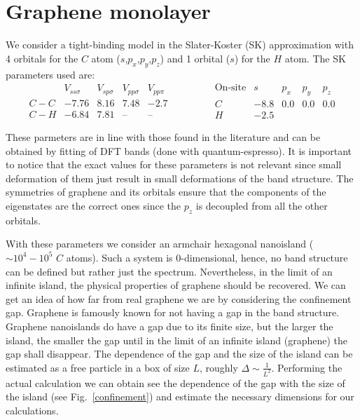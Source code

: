 \chapter{Graphene monolayer}
We consider a tight-binding model in the Slater-Koster (SK) approximation with 4 orbitals for the $C$ atom ($s$,$p_x$,$p_y$,$p_z$) and 1 orbital ($s$) for the $H$ atom. The SK parameters used are:
\begin{equation}
  \begin{array}{l|cccc}
        & V_{ss\sigma} & V_{sp\sigma} & V_{pp\sigma} & V_{pp\pi} \\ \hline
    C-C & -7.76 & 8.16 & 7.48 & -2.7 \\
    C-H & -6.84 & 7.81 & \text{--} & \text{--}
  \end{array}\qquad\qquad
  \begin{array}{c|cccc}
    \text{On-site} & s & p_x & p_y & p_z \\ \hline
    C & -8.8 & 0.0 & 0.0 & 0.0 \\
    H & -2.5 &     &     &
  \end{array}
\label{SK_params}
\end{equation}

These parmeters are in line with those found in the literature\cite{Gosalbez-Martinez2011,Konschuh2010} and can be obtained by fitting of DFT bands (done with quantum-espresso). It is important to notice that the exact values for these parameters is not relevant since small deformation of them just result in small deformations of the band structure. The symmetries of graphene and its orbitals ensure that the components of the eigenstates are the correct ones since the $p_z$ is decoupled from all the other orbitals.

With these parameters we consider an armchair hexagonal nanoisland ($\sim10^4-10^5$ $C$ atoms). Such a system is 0-dimensional, hence, no band structure can be defined but rather just the spectrum. Nevertheless, in the limit of an infinite island, the physical properties of graphene should be recovered.
We can get an idea of how far from real graphene we are by considering the confinement gap. Graphene is famously known for not having a gap in the band structure. Graphene nanoislands do have a gap due to its finite size, but the larger the island, the smaller the gap until in the limit of an infinite island (graphene) the gap shall disappear. The dependence of the gap and the size of the island can be estimated as a free particle in a box of size $L$, roughly $\Delta\sim\frac{1}{L^2}$. Performing the actual calculation we can obtain see the dependence of the gap with the size of the island (see Fig.~\ref{confinement}) and estimate the necessary dimensions for our calculations.

